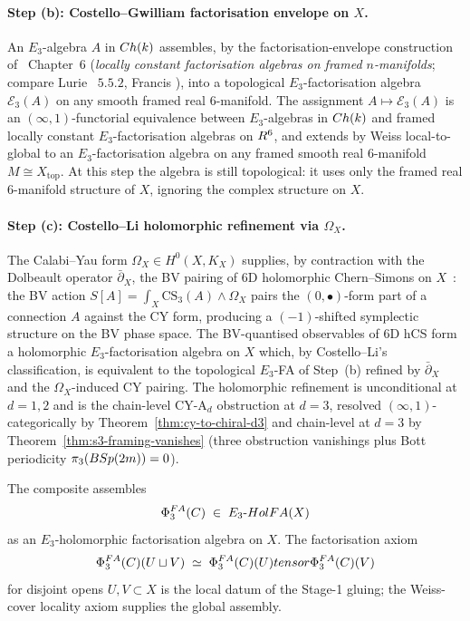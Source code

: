 \paragraph{Step (b): Costello--Gwilliam factorisation envelope on $X$.}
An $E_3$-algebra $A$ in $Ch(k)$ assembles, by the factorisation-envelope
construction of \cite{CostelloGwilliam2017}~Chapter~$6$
(\emph{locally constant factorisation algebras on framed $n$-manifolds};
compare Lurie \cite{LurieHA}~$5.5.2$, Francis \cite{Francis2013}), into
a topological $E_3$-factorisation algebra $\mathcal{E}_3(A)$ on any
smooth framed real $6$-manifold. The assignment
$A \mapsto \mathcal{E}_3(A)$ is an $(\infty, 1)$-functorial equivalence
between $E_3$-algebras in $Ch(k)$ and framed locally constant
$E_3$-factorisation algebras on $R^6$, and extends by Weiss
local-to-global to an $E_3$-factorisation algebra on any framed smooth
real $6$-manifold $M \cong X_{\mathrm{top}}$. At this step the algebra
is still topological: it uses only the framed real $6$-manifold
structure of $X$, ignoring the complex structure on $X$.

\paragraph{Step (c): Costello--Li holomorphic refinement via $\Omega_X$.}
The Calabi--Yau form $\Omega_X \in H^0(X, K_X)$ supplies, by contraction
with the Dolbeault operator $\bar\partial_X$, the BV pairing of 6D
holomorphic Chern--Simons on $X$~\cite{CostelloLi2016,CostelloLi2020}:
the BV action $S[A] = \int_X \mathrm{CS}_3(A) \wedge \Omega_X$ pairs
the $(0, \bullet)$-form part of a connection $A$ against the CY form,
producing a $(-1)$-shifted symplectic structure on the BV phase space.
The BV-quantised observables of 6D hCS form a holomorphic
$E_3$-factorisation algebra on $X$ which, by Costello--Li's
classification, is equivalent to the topological $E_3$-FA of Step~(b)
refined by $\bar\partial_X$ and the $\Omega_X$-induced CY pairing. The
holomorphic refinement is unconditional at $d = 1, 2$ and is the
chain-level CY-A$_d$ obstruction at $d = 3$, resolved
$(\infty, 1)$-categorically by Theorem~\ref{thm:cy-to-chiral-d3} and
chain-level at $d = 3$ by Theorem~\ref{thm:s3-framing-vanishes}
(three obstruction vanishings plus Bott periodicity
$\pi_3(BSp(2m)) = 0$).

The composite assembles
\begin{equation}
\label{eq:stage-one-output}
  \Phi^{FA}_3(C) \;\in\; E_3\text{-}HolFA(X)
\end{equation}
as an $E_3$-holomorphic factorisation algebra on $X$. The
factorisation axiom
\begin{equation}
\label{eq:stage-one-factorisation}
  \Phi^{FA}_3(C)(U \sqcup V) \;\simeq\;
  \Phi^{FA}_3(C)(U) tensor \Phi^{FA}_3(C)(V)
\end{equation}
for disjoint opens $U, V \subset X$ is the local datum of the Stage-1
gluing; the Weiss-cover locality axiom supplies the global assembly.

